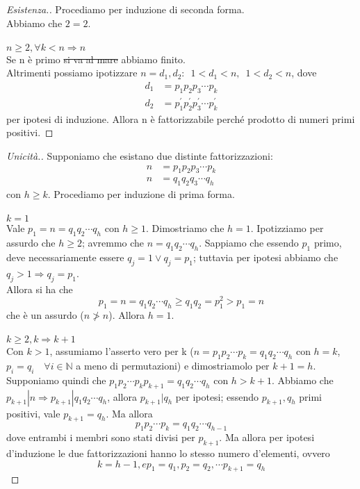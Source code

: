 \documentclass[12pt,twoscolu]{article}
\newcommand{\N}{\mathbb{N}}
\newcommand{\implica}{\Longrightarrow}
\newcommand{\pr}{\prime}
\renewcommand\qedsymbol{$\blacksquare$}
\newcommand{\baseinduz}[1]{\newline\newline {\boldmath$n = #1$}}
\newcommand{\induzdue}[1]{\\\\{\boldmath$n \ge #1, \forall k < n \implica n$}}
\begin{document}
\renewcommand\qedsymbol{$\square$}
\begin{proof}[Esistenza.]
Procediamo per induzione di seconda forma.
\baseinduz{2}
\\Abbiamo che $ 2 = 2 $.
\induzdue{2}
\\Se n è primo \sout{si va al mare} abbiamo finito.
\\Altrimenti possiamo ipotizzare $n = d_1, d_2 :\enspace1 < d_1 < n,\enspace1 < d_2 < n$, dove
\begin{align*}
d_1 &= p_1 p_2 p_3 \cdots p_k \\
 d_2 &= p^{\pr}_1 p^{\pr}_2 p^{\pr}_3 \cdots p^{\pr}_k
\end{align*}
 per ipotesi di induzione. Allora n è fattorizzabile perché prodotto di numeri primi positivi.
\end{proof}

\renewcommand\qedsymbol{$\blacksquare$}
\begin{proof}[Unicità.]
Supponiamo che esistano due distinte fattorizzazioni:
\begin{align*}
n &= p_1 p_2 p_3 \cdots p_k \\
n &= q_1 q_2 q_3 \cdots q_h
\end{align*}
con $h \ge k$. Procediamo per induzione di prima forma.
\\\\{\boldmath$k = 1$}
\\Vale $p_1 = n = q_1 q_2 \cdots q_h$ con $h \ge 1$. Dimostriamo che $h = 1$. Ipotizziamo per assurdo che $ h \ge 2$; avremmo che $ n = q_1 q_2 \cdots q_h$. Sappiamo che essendo $p_1$ primo, deve necessariamente essere $ q_j = 1 \lor q_j = p_1$; tuttavia per ipotesi abbiamo che $q_j > 1 \implica q_j = p_1$.
\\Allora si ha che
$$ p_1 = n = q_1 q_2 \cdots q_h \ge q_1 q_2 = p^2_1 > p_1 = n $$
che è un assurdo ($n \ngtr n$). Allora $h = 1$.
\\\\{\boldmath$k \ge 2, k \implica k+1$}
\\Con $ k > 1 $, assumiamo l'asserto vero per k ($n = p_1 p_2 \cdots p_k = q_1 q_2 \cdots q_h$ con $h = k$, $p_i = q_i \quad\forall i \in \N$ a meno di permutazioni) e dimostriamolo per $k + 1 = h$. Supponiamo quindi che $p_1 p_2 \cdots p_k p_{k+1} = q_1 q_2 \cdots q_h$ con $h > k + 1$. Abbiamo che $p_{k+1} | n \implica p_{k+1} | q_1 q_2 \cdots q_h$, allora $p_{k+1} | q_h$ per ipotesi; essendo $p_{k+1}, q_h$ primi positivi, vale $p_{k+1} = q_h$. Ma allora 
$$p_1 p_2 \cdots p_k = q_1 q_2 \cdots q_{h-1} $$
dove entrambi i membri sono stati divisi per $p_{k+1}$. Ma allora per ipotesi d'induzione le due fattorizzazioni hanno lo stesso numero d'elementi, ovvero 
$$k = h - 1, e p_1 = q_1, p_2 = q_2, \cdots p_{k+1} = q_h$$
\end{proof}
\end{document}
